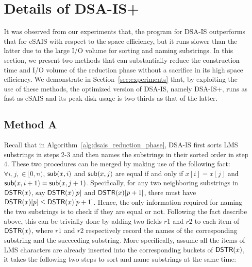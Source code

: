 \documentclass[10pt,journal,compsoc]{IEEEtran}
\begin{document}
\section{Details of DSA-IS+} \label{sec:dsais_plus}

It was observed from our experiments that, the program for DSA-IS outperforms that for eSAIS with respect to the space efficiency, but it runs slower than the latter due to the large I/O volume for sorting and naming substrings. In this section, we present two methods that can  substantially reduce the construction time and I/O volume of the reduction phase without a sacrifice in its high space efficiency. We demonstrate in Section~\ref{sec:experiments} that, by exploiting the use of these methods, the optimized version of DSA-IS, namely DSA-IS+, runs as fast as eSAIS and its peak disk usage is two-thirds as that of the latter.

\subsection{Method A} \label{subsec:dsais_plus_method_a}
Recall that in Algorithm~\ref{alg:dsais_reduction_phase}, DSA-IS first sorts LMS substrings in steps 2-3 and then names the substrings in their sorted order in step 4. These two procedures can be merged by making use of the following fact: $\forall i, j, \in [0, n)$, ${\sf sub}(x, i)$ and ${\sf sub}(x, j)$ are equal if and only if $x[i] = x[j]$ and ${\sf sub}(x, i + 1) = {\sf sub}(x, j + 1)$. Specifically, for any two neighboring substrings in ${\sf DSTR}(x)$, say ${\sf DSTR}(x)[p]$ and ${\sf DSTR}(x)[p + 1]$, there must have ${\sf DSTR}(x)[p] \le {\sf DSTR}(x)[p + 1]$. Hence, the only information required for naming the two substrings is to check if they are equal or not. Following the fact describe above, this can be trivially done by adding two fields $r1$ and $r2$ to each item of ${\sf DSTR}(x)$, where $r1$ and $r2$ respectively record the names of the corresponding substring and the succeeding substring. More specifically, assume all the items of LMS characters are already inserted into the corresponding buckets of ${\sf DSTR}(x)$, it takes the following two steps to sort and name substrings at the same time:
\end{document}

